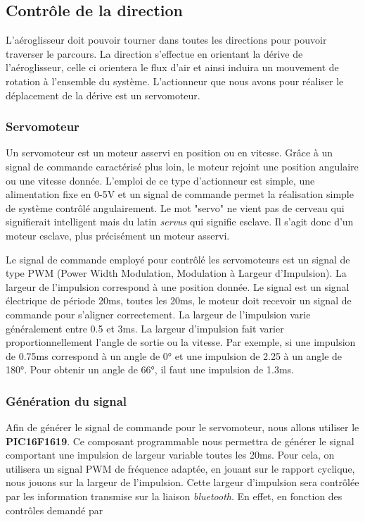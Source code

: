 \documentclass[a4paper,12pt]{report}
\begin{document}
		\subsection{Contrôle de la direction}
			L'aéroglisseur doit pouvoir tourner dans toutes les directions pour pouvoir traverser le parcours. La direction s'effectue en orientant la dérive de l'aéroglisseur, celle ci orientera le flux d'air et ainsi induira un mouvement de rotation à l'ensemble du système. L'actionneur que nous avons pour réaliser le déplacement de la dérive est un servomoteur.
			\subsubsection{Servomoteur}
			Un servomoteur est un moteur asservi en position ou en vitesse. Grâce à un signal de commande caractérisé plus loin, le moteur rejoint une position angulaire ou une vitesse donnée. L'emploi de ce type d'actionneur est simple, une alimentation fixe en 0-5V et un signal de commande permet la réalisation simple de système contrôlé angulairement. Le mot "servo" ne vient pas de cerveau qui signifierait intelligent mais du latin \textit{servus} qui signifie esclave. Il s'agit donc d'un moteur esclave, plus précisément un moteur asservi.
			
			Le signal de commande employé pour contrôlé les servomoteurs est un signal de type PWM (Power Width Modulation, Modulation à Largeur d'Impulsion). La largeur de l'impulsion correspond à une position donnée. Le signal est un signal électrique de période 20ms, toutes les 20ms, le moteur doit recevoir un signal de commande pour s'aligner correctement. La largeur de l'impulsion varie généralement entre 0.5 et 3ms. La largeur d'impulsion fait varier proportionnellement l'angle de sortie ou la vitesse. Par exemple, si une impulsion de 0.75ms correspond à un angle de 0° et une impulsion de 2.25 à un angle de 180°. Pour obtenir un angle de 66°, il faut une impulsion de 1.3ms.   
			\subsubsection{Génération du signal}
			Afin de générer le signal de commande pour le servomoteur, nous allons utiliser le \textbf{PIC16F1619}. Ce composant programmable nous permettra de générer le signal comportant une impulsion de largeur variable toutes les 20ms. Pour cela, on utilisera un signal PWM de fréquence adaptée, en jouant sur le rapport cyclique, nous jouons sur la largeur de l'impulsion. Cette largeur d'impulsion sera contrôlée par les information transmise sur la liaison \textit{bluetooth}. En effet, en fonction des contrôles demandé par 
\end{document}
